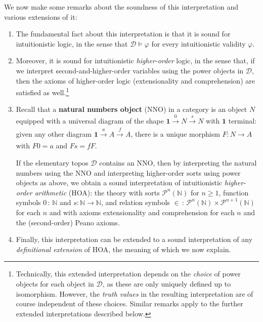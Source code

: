 \documentclass[11pt]{amsart}
\newcommand\cD{\mathcal{D}}
\newcommand\defword[1]{\textbf{#1}}
\newcommand{\N}{\mathbb{N}}
\renewcommand\phi{\varphi}
\newcommand\pow{\mathcal{P}}
\newcommand\tm{\mathbf{1}}
\newcommand\tolon{{\,:\,}}
\newcommand\tox[2][]{\xrightarrow[#1]{#2}}
\theoremstyle{definition}
\theoremstyle{remark}
\theoremstyle{plain}
\begin{document}
We now make some remarks about the soundness of this interpretation and various extensions of it:
\begin{enumerate}[1.]
\item The fundamental fact about this interpretation is that it is sound for intuitionistic logic, in the sense that \( \cD \vDash \phi \) for every intuitionistic validity \( \phi \).
\item Moreover, it is sound for intuitionistic \emph{higher-order} logic, in the sense that, if we interpret second-and-higher-order variables using the power objects in \( \cD \), then the axioms of higher-order logic (extensionality and comprehension) are satisfied as well.\footnote{
    Technically, this extended interpretation depends on the \emph{choice} of power objects for each object in \( \cD \), as these are only uniquely defined up to isomorphism.
    However, the \emph{truth values} in the resulting interpretation are of course independent of these choices.
    Similar remarks apply to the further extended interpretations described below.
  }
\item Recall that a \defword{natural numbers object} (NNO) in a category is an object \( N \) equipped with a universal diagram of the shape \( \tm \tox{0} N \tox{s} N \) with \( \tm \) terminal: given any other diagram \( \tm \tox{a} A \tox{f} A \), there is a unique morphism \( F \colon N \to A \) with \( F 0 = a \) and \( F s = f F \).

  If the elementary topos \( \cD \) contains an NNO, then by interpreting the natural numbers using the NNO and interpreting higher-order sorts using power objects as above, we obtain a sound interpretation of intuitionistic \emph{higher-order arithmetic} (HOA): the theory with sorts \( \pow^n(\N) \) for \( n \ge 1 \), function symbols \( 0 \tolon \N \) and \( s \colon \N \to \N \), and relation symbols \( {\in} \tolon \pow^n(\N) \times \pow^{n+1}(\N) \) for each \( n \) and with axioms extensionality and comprehension for each \( n \) and the (second-order) Peano axioms.
\item Finally, this interpretation can be extended to a sound interpretation of any \emph{definitional extension} of HOA, the meaning of which we now explain.


\end{enumerate}
\end{document}
